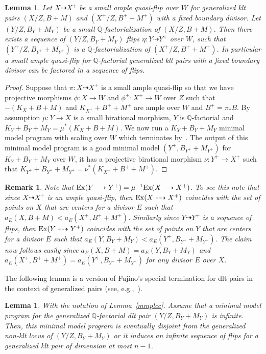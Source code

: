 \documentclass{amsart}
\renewcommand{\qq}{\mathbb{Q}}
\newtheorem{lemma}[theorem]{Lemma}
\newtheorem{remark}[theorem]{Remark}
\theoremstyle{remark}
\numberwithin{equation}{section}
\begin{document}
\begin{lemma}\label{fromqftoflip}
Let $X\dasharrow X^+$ be a small ample quasi-flip over $W$ for generalized klt pairs $(X/Z,B+M)$ and $(X^+/Z,B^++M^+)$ with a fixed boundary divisor.  
Let $(Y/Z,B_Y+M_Y)$  be a small $\qq$-factorialization of $(X/Z,B+M)$. 
Then there exists a sequence of $(Y/Z,B_Y+M_Y)$ flips $\eta: Y\dasharrow Y^+$ over $W$, such that $(Y^+/Z,B_{Y^+}+M_{Y^+})$ is a $\qq$-factorialization of $(X^+/Z,B^++M^+)$.
In particular a small ample quasi-flip for $\qq$-factorial generalized klt pairs with a fixed boundary divisor can be factored in a sequence of flips.
\end{lemma}

\begin{proof}
Suppose that $\pi :X\dasharrow X^+$ is a small ample quasi-flip so that we have  projective morphisms $\phi :X\to W$ and $\phi^+:X^+\to W$ over $Z$ such that $-(K_X+B+M)$ and $K_{X^+}+B^++M^+$ are ample over $W$ and $B^+=\pi _* B$.  
By assumption $\mu :Y\to X$ is a small birational morphism, $Y$ is $\qq$-factorial and $K_Y+B_Y+M_Y=\mu ^*(K_X+B+M)$.
We now run a $K_Y+B_Y+M_Y$ minimal model program with scaling over $W$ 
which terminates by~\cite[Lemma 4.4]{BZ16}. The output of this minimal model program is a good minimal model $(Y^+,B_{Y^+}+M_{Y^+})$ for $K_Y+B_Y+M_Y$ over $W$,
it has a projective birational morphism $\nu\colon Y^+\rightarrow X^+$ such that $K_{Y^+}+B_{Y^+}+M_{Y^+}=\nu^*(K_{X^+}+B^++M^+)$.
\end{proof}

\begin{remark}\label{r-1} Note that ${\rm Ex}(Y\dasharrow Y^+)=\mu ^{-1}{\rm Ex}(X\dasharrow X^+)$.
To see this note that since $X\dasharrow X^+$ is an ample quasi-flip, then ${\rm Ex}(X\dasharrow X^+)$ coincides with the set of points on $X$ that are centers for a divisor $E$ such that $a_E(X,B+M)<a_E(X^+,B^++M^+)$. Similarly since $Y\dasharrow Y^+$ is a sequence of flips, then ${\rm Ex}(Y\dasharrow Y^+)$ coincides with the set of points on $Y$ that are centers for a divisor $E$ such that $a_E(Y,B_Y+M_Y)<a_E(Y^+,B_{Y^+}+M_{Y^+})$. The claim now follows easily since $a_E(X,B+M)=a_E(Y,B_Y+M_Y)$ and $a_E(X^+,B^++M^+)=a_E(Y^+,B_{Y^+}+M_{Y^+})$ for any divisor $E$ over $X$. 
\end{remark}
The following lemma is a version of Fujino's special termination for dlt pairs in the context of generalized pairs (see, e.g.,~\cite{Fuj07}).

\begin{lemma}\label{lemma}
With the notation of Lemma~\ref{mmplcc}. Assume that a minimal model program for the generalized $\qq$-factorial dlt pair $(Y/Z,B_Y+M_Y)$ is infinite.
Then, this minimal model program is eventually disjoint from the generalized non-klt locus of $(Y/Z,B_Y+M_Y)$ or
it induces an infinite sequence of flips for a generalized klt pair of dimension at most $n-1$.
\end{lemma}
\end{document}
